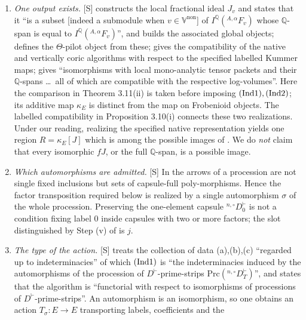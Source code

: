 \documentclass[11pt]{article}
\theoremstyle{plain}
\theoremstyle{definition}
\newcommand{\VV}{\mathbb{V}}
\newcommand{\Ind}[1]{\textup{(Ind#1)}}
\begin{document}
\begin{enumerate}[label=\textbf{(SA\arabic*)},leftmargin=3.2em]
\item \emph{One output exists.}  [S] \cite[Proposition 3.7(ii),(v)]{IUT3}
  constructs the local fractional ideal $J_v$ and states that it ``is a subset
  [indeed a submodule when $v\in\VV^{\mathrm{non}}$] of
  $I^{\mathbb{Q}}({}^{A,\alpha}F_v)$ whose $\mathbb{Q}$-span is equal to
  $I^{\mathbb{Q}}({}^{A,\alpha}F_v)$'', and builds the associated global objects;
  \cite[Definition 3.8(i)]{IUT3} defines the $\Theta$-pilot object from these;
  \cite[Proposition 3.10(i)]{IUT3} gives the compatibility of the native and
  vertically coric algorithms with respect to the specified labelled Kummer
  maps; \cite[Theorem 3.11(ii)(a)]{IUT3} gives ``isomorphisms with local
  mono-analytic tensor packets and their $\mathbb{Q}$-spans \ldots\ all of which
  are compatible with the respective log-volumes''.  Here the comparison in
  Theorem 3.11(ii) is taken before imposing $\Ind1,\Ind2$; its additive map
  $\kappa_E$ is distinct from the map on Frobenioid objects.  The labelled
  compatibility in Proposition 3.10(i) connects these two realizations.
  Under our reading, realizing the specified native representation yields one region
  $R=\kappa_E[J]$ which is among the possible images of
  \cite[Corollary 3.12]{IUT3}.  We do \emph{not} claim that every isomorphic
  $fJ$, or the full $\mathbb{Q}$-span, is a possible image.
\item \emph{Which automorphisms are admitted.}  [S] In \cite[\S0 and
  Definition 4.10]{IUT1} the arrows of a procession are not single fixed
  inclusions but sets of capsule-full poly-morphisms.  Hence the factor
  transposition required below is realized by a single automorphism $\sigma$ of
  the whole procession.  Preserving the one-element capsule
  ${}^{n,\circ}D^\vdash_0$ is not a condition fixing label $0$
  inside capsules with two or more factors; the slot distinguished by Step (v)
  of \cite[Theorem 1.10]{IUT4} is $j$.
\item \emph{The type of the action.}  [S] \cite[Theorem 3.11(i)]{IUT3} treats the
  collection of data (a),(b),(c) ``regarded up to indeterminacies'' of which
  $\Ind1$ is ``the indeterminacies induced by the automorphisms of the procession
  of $D^\vdash$-prime-strips $\mathrm{Prc}({}^{n,\circ}D^\vdash_T)$'', and states
  that the algorithm is ``functorial with respect to isomorphisms of processions
  of $D^\vdash$-prime-strips''.  An automorphism is an isomorphism, so one
  obtains an action $T_\sigma:E\to E$ transporting labels, coefficients and the

\end{enumerate}
\end{document}
